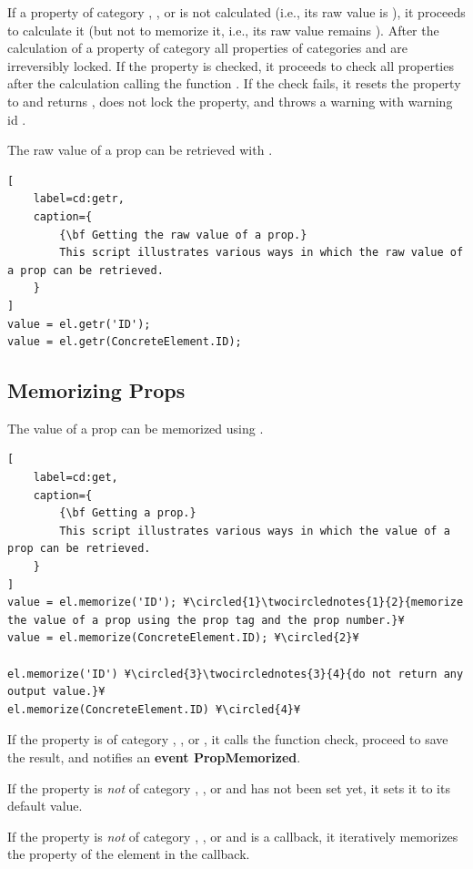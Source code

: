 \documentclass{tufte-handout}
\begin{document}
If a property of category , , or  is not calculated (i.e., its raw value is ), it proceeds to calculate it (but not to memorize it, i.e., its raw value remains ). After the calculation of a property of category  all properties of categories  and  are irreversibly locked.
If the property is checked, it proceeds to check all properties after the calculation calling the function . If the check fails, it resets the property to  and returns , does not lock the property, and throws a warning with warning id .

The raw value of a prop can be retrieved with .
%
\begin{lstlisting}[
	label=cd:getr,
	caption={
		{\bf Getting the raw value of a prop.}
		This script illustrates various ways in which the raw value of a prop can be retrieved.
	}
]
value = el.getr('ID');
value = el.getr(ConcreteElement.ID);
\end{lstlisting}

\subsection{Memorizing Props}  

The value of a prop can be memorized using .
%
\begin{lstlisting}[
	label=cd:get,
	caption={
		{\bf Getting a prop.}
		This script illustrates various ways in which the value of a prop can be retrieved.
	}
]
value = el.memorize('ID'); ¥\circled{1}\twocirclednotes{1}{2}{memorize the value of a prop using the prop tag and the prop number.}¥
value = el.memorize(ConcreteElement.ID); ¥\circled{2}¥

el.memorize('ID') ¥\circled{3}\twocirclednotes{3}{4}{do not return any output value.}¥
el.memorize(ConcreteElement.ID) ¥\circled{4}¥
\end{lstlisting}

If the property is of category , , or , it calls the function check, proceed to save the result, and notifies an {\bf event PropMemorized}.

If the property is \emph{not} of category , , or  and has not been set yet, it sets it to its default value.
 
If the property is \emph{not} of category , , or  and is a callback, it iteratively memorizes the property of the element in the callback.
 
\end{document}
